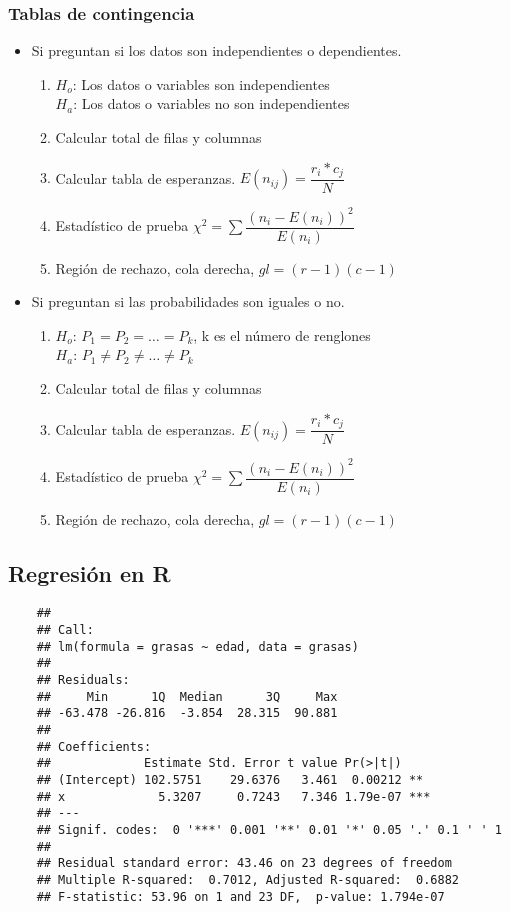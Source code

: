 \subsubsection{Tablas de contingencia}
\begin{itemize}
	\item Si preguntan si los datos son independientes o dependientes.
	\begin{enumerate}
		\item $H_o$: Los datos  o variables son independientes\\
		$H_a$: Los datos o variables no son independientes
		\item Calcular total de filas y columnas
		\item Calcular tabla de esperanzas. $E(n_{ij})=\dfrac{r_i*c_j}{N}$
		\item Estadístico de prueba $\chi^2=\sum\dfrac{(n_i-E(n_i))^2}{E(n_i)}$
		\item Región de rechazo, cola derecha, $gl=(r-1)(c-1)$
	\end{enumerate}
	\item Si preguntan si las probabilidades son iguales o no.
	\begin{enumerate}
		\item $H_o$: $P_1=P_2=\dots=P_k$, k es el número de renglones\\
		$H_a$:  $P_1\not=P_2\not=\dots\not=P_k$
		\item Calcular total de filas y columnas
		\item Calcular tabla de esperanzas. $E(n_{ij})=\dfrac{r_i*c_j}{N}$
		\item Estadístico de prueba $\chi^2=\sum\dfrac{(n_i-E(n_i))^2}{E(n_i)}$
		\item Región de rechazo, cola derecha, $gl=(r-1)(c-1)$
	\end{enumerate}
\end{itemize}

\subsection{Regresión en R}
\begin{verbatim}
	## 
	## Call:
	## lm(formula = grasas ~ edad, data = grasas)
	## 
	## Residuals:
	##     Min      1Q  Median      3Q     Max 
	## -63.478 -26.816  -3.854  28.315  90.881 
	## 
	## Coefficients:
	##             Estimate Std. Error t value Pr(>|t|)    
	## (Intercept) 102.5751    29.6376   3.461  0.00212 ** 
	## x             5.3207     0.7243   7.346 1.79e-07 ***
	## ---
	## Signif. codes:  0 '***' 0.001 '**' 0.01 '*' 0.05 '.' 0.1 ' ' 1
	## 
	## Residual standard error: 43.46 on 23 degrees of freedom
	## Multiple R-squared:  0.7012, Adjusted R-squared:  0.6882 
	## F-statistic: 53.96 on 1 and 23 DF,  p-value: 1.794e-07
\end{verbatim}

